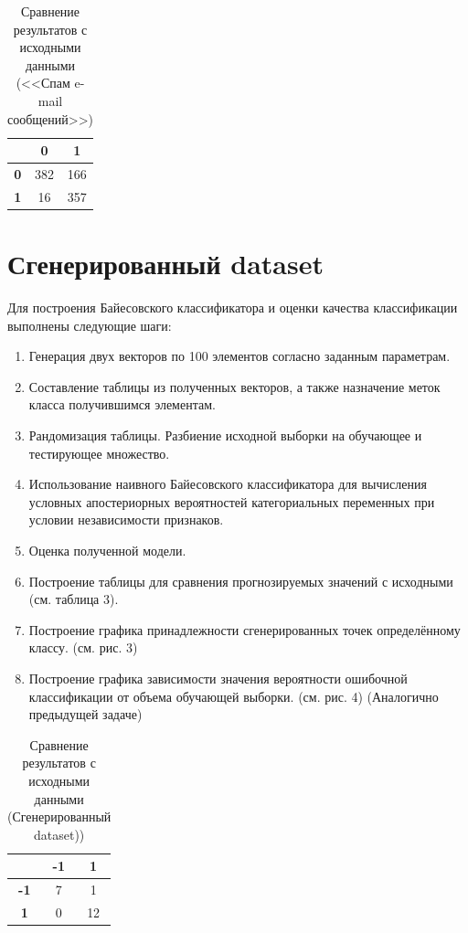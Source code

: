 \documentclass[]{article}
\numberwithin{equation}{section}
\begin{document}
        \begin{table}[H]
            \centering
            \begin{tabular}{|c|c|c|}
              \hline
                & \textbf{0} & \textbf{1} \\
              \hline
              \textbf{0} & 382 & 166\\
              \hline
              \textbf{1} & 16 & 357 \\
              \hline
            \end{tabular}
            \caption{Сравнение результатов с исходными данными (<<Спам e-mail сообщений>>)}
        \end{table}

    \section{Сгенерированный dataset}
        Для построения Байесовского классификатора и оценки качества классификации выполнены следующие шаги:

        \begin{enumerate}
            \item Генерация двух векторов по 100 элементов согласно заданным параметрам.
            \item Составление таблицы из полученных векторов, а также назначение меток класса получившимся элементам.
            \item Рандомизация таблицы.
            Разбиение исходной выборки на обучающее и тестирующее множество.
            \item Использование наивного Байесовского классификатора для вычисления условных апостериорных вероятностей категориальных переменных при условии независимости признаков.
            \item Оценка полученной модели.
            \item Построение таблицы для сравнения прогнозируемых значений с исходными (см. таблица 3).
            \item Построение графика принадлежности сгенерированных точек определённому классу. (см. рис. 3)
            \item Построение графика зависимости значения вероятности ошибочной классификации от объема обучающей выборки. (см. рис. 4) (Аналогично предыдущей задаче)
        \end{enumerate}

        \begin{table}[H]
            \centering
            \begin{tabular}{|c|c|c|}
              \hline
                & \textbf{-1} & \textbf{1} \\
              \hline
              \textbf{-1} & 7 & 1\\
              \hline
              \textbf{1} & 0 & 12 \\
              \hline
            \end{tabular}
            \caption{Сравнение результатов с исходными данными (Сгенерированный dataset))}
        \end{table}
\end{document}

